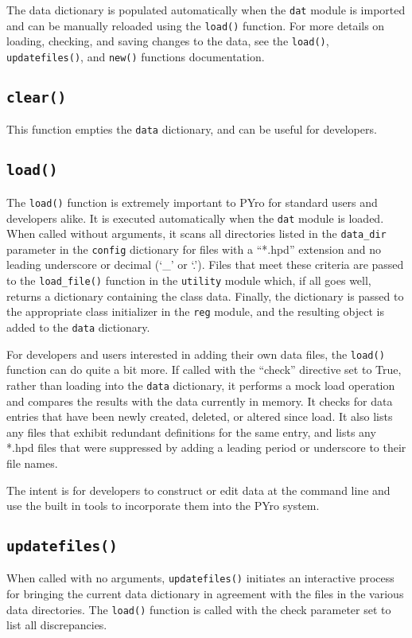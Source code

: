 The data dictionary is populated automatically when the \verb|dat| module is imported and can be manually reloaded using the \verb|load()| function.  For more details on loading, checking, and saving changes to the data, see the \verb|load()|, \verb|updatefiles()|, and \verb|new()| functions documentation.

\subsection{\texttt{clear()}}
This function empties the \verb|data| dictionary, and can be useful for developers.

\subsection{\texttt{load()}}
The \verb|load()| function is extremely important to PYro for standard users and developers alike.  It is executed automatically when the \verb|dat| module is loaded.  When called without arguments, it scans all directories listed in the \verb|data_dir| parameter in the \verb|config| dictionary for files with a ``*.hpd'' extension and no leading underscore or decimal (`\_' or `.').  Files that meet these criteria are passed to the \verb|load_file()| function in the \verb|utility| module which, if all goes well, returns a dictionary containing the class data.  Finally, the dictionary is passed to the appropriate class initializer in the \verb|reg| module, and the resulting object is added to the \verb|data| dictionary.

For developers and users interested in adding their own data files, the \verb|load()| function can do quite a bit more.  If called with the ``check'' directive set to True, rather than loading into the \verb|data| dictionary, it performs a mock load operation and compares the results with the data currently in memory.  It checks for data entries that have been newly created, deleted, or altered since load.  It also lists any files that exhibit redundant definitions for the same entry, and lists any *.hpd files that were suppressed by adding a leading period or underscore to their file names.

The intent is for developers to construct or edit data at the command line and use the built in tools to incorporate them into the PYro system.

\subsection{\texttt{updatefiles()}}
When called with no arguments, \verb|updatefiles()| initiates an interactive process for bringing the current data dictionary in agreement with the files in the various data directories.  The \verb|load()| function is called with the check parameter set to list all discrepancies.

